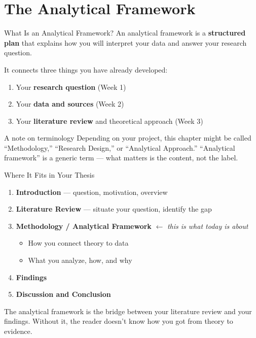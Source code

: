 \documentclass[aspectratio=169,11pt]{beamer}
\begin{document}
\section{The Analytical Framework}

\begin{frame}{What Is an Analytical Framework?}
    An analytical framework is a \textbf{structured plan} that explains how you will interpret your data and answer your research question.
    \vspace{0.3cm}

    It connects three things you have already developed:
    \vspace{0.3cm}
    \begin{enumerate}
        \item Your \textbf{research question} (Week 1)
        \item Your \textbf{data and sources} (Week 2)
        \item Your \textbf{literature review} and theoretical approach (Week 3)
    \end{enumerate}
    \vspace{0.3cm}
    \begin{exampleblock}{A note on terminology}
        Depending on your project, this chapter might be called ``Methodology,'' ``Research Design,'' or ``Analytical Approach.'' ``Analytical framework'' is a generic term --- what matters is the content, not the label.
    \end{exampleblock}
\end{frame}

\begin{frame}{Where It Fits in Your Thesis}
    \begin{enumerate}
        \item \textbf{Introduction} --- question, motivation, overview
        \item \textbf{Literature Review} --- situate your question, identify the gap
        \item \textbf{Methodology / Analytical Framework} $\leftarrow$ \textit{this is what today is about}
        \begin{itemize}
            \item How you connect theory to data
            \item What you analyze, how, and why
        \end{itemize}
        \item \textbf{Findings}
        \item \textbf{Discussion and Conclusion}
    \end{enumerate}
    \vspace{0.3cm}
    The analytical framework is the bridge between your literature review and your findings. Without it, the reader doesn't know how you got from theory to evidence.
\end{frame}
\end{document}
